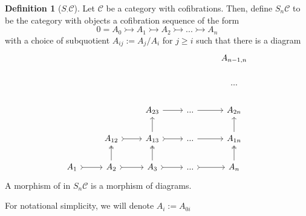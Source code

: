 \documentclass{article}
\theoremstyle{definition}
\theoremstyle{definition}
\newtheorem{definition}{Definition}[theorem]
\theoremstyle{definition}
\theoremstyle{definition}
\theoremstyle{definition}
\theoremstyle{definition}
\theoremstyle{definition}
\begin{document}
\begin{tcolorbox}[colback=purple!5!white,colframe=purple!75!black]
\begin{definition}[$S_{\cdot}\mathcal{C}$]
Let $\mathcal{C}$ be a category with cofibrations. Then, define $S_n \mathcal{C}$ to be the category with objects a cofibration sequence of the form
\[0=A_0\rightarrowtail A_1\rightarrowtail A_2\rightarrowtail ...\rightarrowtail A_n\]
with a choice of subquotient $A_{ij}:=A_j/A_i$ for $j\geq i$ such that there is a diagram 
\[\begin{tikzcd}
	&&&& {A_{n-1,n}} \\
	&&&& {...} \\
	&& {A_{23}} & {...} & {A_{2n}} \\
	& {A_{12}} & {A_{13}} & {...} & {A_{1n}} \\
	{A_1} & {A_2} & {A_3} & {...} & {A_n}
	\arrow[from=3-3, to=3-4]
	\arrow[from=3-4, to=3-5]
	\arrow[tail, from=4-2, to=4-3]
	\arrow[from=4-3, to=3-3]
	\arrow[tail, from=4-3, to=4-4]
	\arrow[from=4-4, to=4-5]
	\arrow[from=4-5, to=3-5]
	\arrow[tail, from=5-1, to=5-2]
	\arrow[two heads, from=5-2, to=4-2]
	\arrow[tail, from=5-2, to=5-3]
	\arrow[two heads, from=5-3, to=4-3]
	\arrow[tail, from=5-3, to=5-4]
	\arrow[tail, from=5-4, to=5-5]
	\arrow[two heads, from=5-5, to=4-5]
\end{tikzcd}\]
A morphism of in $S_n \mathcal{C}$ is a morphism of diagrams.
\end{definition}
\end{tcolorbox}
For notational simplicity, we will denote $A_i:=A_{0i}$ 
\end{document}
